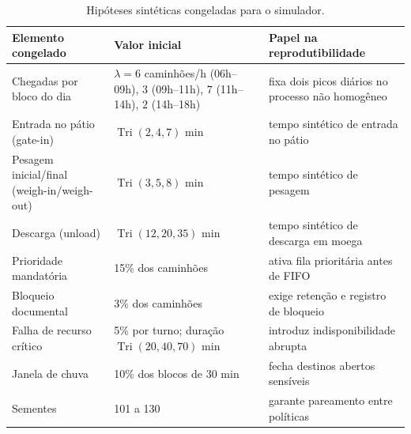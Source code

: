 \documentclass[
  12pt,
  oneside,
  a4paper,
  sumario=tradicional,
  brazil
]{abntex2}
\begin{document}
\begin{table}[H]
\centering
\small
\begin{tabular}{|p{}|p{}|p{}|}
\hline
\textbf{Elemento congelado} & \textbf{Valor inicial} & \textbf{Papel na reprodutibilidade} \\
\hline
Chegadas por bloco do dia & $\lambda = 6$ caminh\~oes/h (06h--09h), $3$ (09h--11h), $7$ (11h--14h), $2$ (14h--18h) & fixa dois picos di\'arios no processo n\~ao homog\^eneo \\
\hline
Entrada no p\'atio (gate-in) & $\operatorname{Tri}(2,4,7)$ min & tempo sint\'etico de entrada no p\'atio \\
\hline
Pesagem inicial/final (weigh-in/weigh-out) & $\operatorname{Tri}(3,5,8)$ min & tempo sint\'etico de pesagem \\
\hline
Descarga (unload) & $\operatorname{Tri}(12,20,35)$ min & tempo sint\'etico de descarga em moega \\
\hline
Prioridade mandat\'oria & 15\% dos caminh\~oes & ativa fila priorit\'aria antes de FIFO \\
\hline
Bloqueio documental & 3\% dos caminh\~oes & exige reten\c{c}\~ao e registro de bloqueio \\
\hline
Falha de recurso cr\'itico & 5\% por turno; dura\c{c}\~ao $\operatorname{Tri}(20,40,70)$ min & introduz indisponibilidade abrupta \\
\hline
Janela de chuva & 10\% dos blocos de 30 min & fecha destinos abertos sens\'iveis \\
\hline
Sementes & 101 a 130 & garante pareamento entre pol\'iticas \\
\hline
\end{tabular}
\caption{Hip\'oteses sint\'eticas congeladas para o simulador.}
\end{table}
\end{document}

